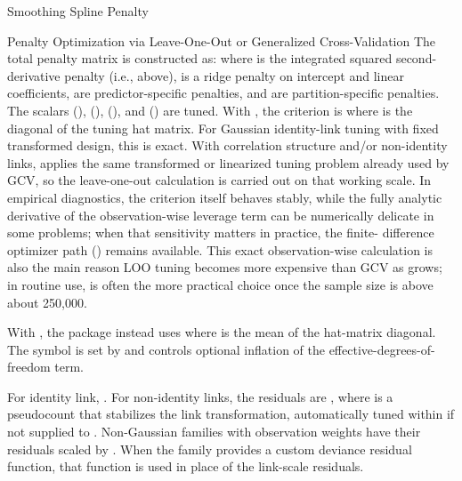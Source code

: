 \begin{Section}{Smoothing Spline Penalty}
\begin{SubSection}{Penalty Optimization via Leave-One-Out or Generalized Cross-Validation}
The total penalty matrix \eqn{\boldsymbol{\Lambda}}{} is constructed as:
where  is the integrated squared second-derivative
penalty (i.e.,  above),  is
a ridge penalty on intercept and linear coefficients,
 are predictor-specific penalties, and
 are partition-specific penalties. The
scalars  (), 
(), 
(), and 
() are tuned.
With , the criterion is
where  is the diagonal of the tuning hat matrix. For Gaussian
identity-link tuning with fixed transformed design, this is exact. With
correlation structure and/or non-identity links,  applies the
same transformed or linearized tuning problem already used by GCV, so the
leave-one-out calculation is carried out on that working scale. In empirical
diagnostics, the criterion itself behaves stably, while the fully analytic
derivative of the observation-wise leverage term can be numerically delicate
in some problems; when that sensitivity matters in practice, the finite-
difference optimizer path () remains
available. This exact observation-wise calculation is also the main reason
LOO tuning becomes more expensive than GCV as  grows; in routine use,
 is often the more practical choice once the
sample size is above about 250,000.

With , the package instead uses
where  is the mean of the
hat-matrix diagonal. The symbol \eqn{\gamma}{} is set by
 and controls optional inflation of the
effective-degrees-of-freedom term.

For identity link, . For non-identity links,
the residuals are
,
where  is a pseudocount that stabilizes the link
transformation, automatically tuned within  if not supplied
to .
Non-Gaussian families with observation weights
 have their residuals scaled by . When the
family provides a custom deviance residual function, that function is used
in place of the link-scale residuals.


\end{SubSection}
\end{Section}
